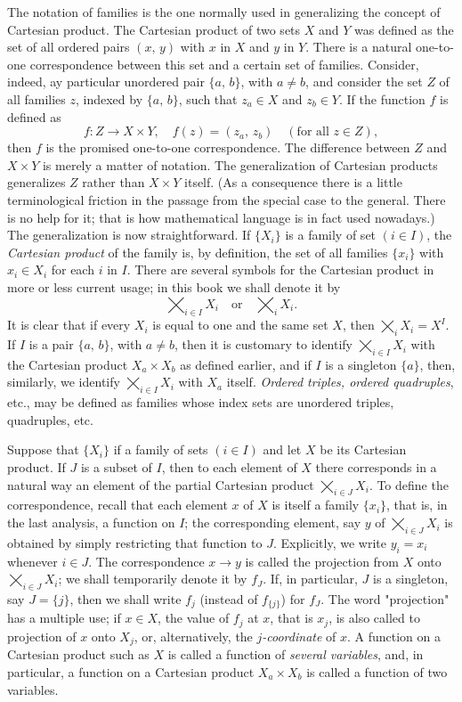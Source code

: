 The notation of families is the one normally used in generalizing the concept of Cartesian product. The Cartesian product of two sets $X$ and $Y$ was defined as the set of all ordered pairs $(x, \, y)$ with $x$ in $X$ and $y$ in $Y$. There is a natural one-to-one correspondence between this set and a certain set of families. Consider, indeed, ay particular unordered pair $\{a, \, b\}$, with $a \neq b$, and consider the set $Z$ of all families $z$, indexed by $\{a,\, b\}$, such that $z_a \in X$ and $z_b \in Y$. If the function $f$ is defined as
\[
	f : Z \to X \times Y, \quad f(z) = (z_a, \, z_b) \quad (\text{for all } z \in Z),
\]
then $f$ is the promised one-to-one correspondence. The difference between $Z$ and $X \times Y$ is merely a matter of notation. The generalization of Cartesian products generalizes $Z$ rather than $X \times Y$ itself. (As a consequence there is a little terminological friction in the passage from the special case to the general. There is no help for it; that is how mathematical language is in fact used nowadays.) The generalization is now straightforward. If $\{X_i\}$ is a family of set $(i \in I)$, the \textit{Cartesian product} of the family is, by definition, the set of all families $\{x_i\}$ with $x_i \in X_i$ for each $i$ in $I$. There are several symbols for the Cartesian product in more or less current usage; in this book we shall denote it by
\[
	\bigtimes_{i \in I} X_i \quad \text{or} \quad \bigtimes_i X_i.
\]
It is clear that if every $X_i$ is equal to one and the same set $X$, then $\bigtimes_i X_i = X^I$. If $I$ is a pair $\{a, \, b\}$, with $a \neq b$, then it is customary to identify $\bigtimes_{i \in I} X_i$ with the Cartesian product $X_a \times X_b$ as defined earlier, and if $I$ is a singleton $\{a\}$, then, similarly, we identify $\bigtimes_{i \in I} X_i$ with $X_a$ itself. \textit{Ordered triples, ordered quadruples}, etc., may be defined as families whose index sets are unordered triples, quadruples, etc.

Suppose that $\{X_i\}$ if a family of sets $(i \in I)$ and let $X$ be its Cartesian product. If $J$ is a subset of $I$, then to each element of $X$ there corresponds in a natural way an element of the partial Cartesian product $\bigtimes_{i \in J} X_i$. To define the correspondence, recall that each element $x$ of $X$ is itself a family $\{x_i\}$, that is, in the last analysis, a function on $I$; the corresponding element, say $y$ of $\bigtimes_{i \in J} X_i$ is obtained by simply restricting that function to $J$. Explicitly, we write $y_i = x_i$ whenever $i \in J$. The correspondence $x \to y$ is called the projection from $X$ onto $\bigtimes_{i \in J} X_i$; we shall temporarily denote it by $f_J$. If, in particular, $J$ is a singleton, say $J = \{j\}$, then we shall write $f_j$ (instead of $f_{\{j\}}$) for $f_J$. The word "projection" has a multiple use; if $x \in X$, the value of $f_j$ at $x$, that is $x_j$, is also called to projection of $x$ onto $X_j$, or, alternatively, the $j$\textit{-coordinate} of $x$. A function on a Cartesian product such as $X$ is called a function of \textit{several variables}, and, in particular, a function on a Cartesian product $X_a \times X_b$ is called a function of two variables.

